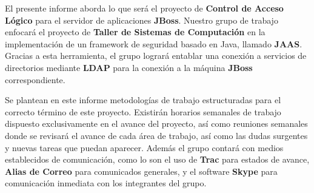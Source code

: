 El presente informe aborda lo que será el proyecto de \textbf{Control de Acceso Lógico} para el servidor de aplicaciones \textbf{JBoss}.
Nuestro grupo de trabajo enfocará el proyecto de \textbf{Taller de Sistemas de Computación} en la implementación de un framework
de seguridad basado en Java, llamado \textbf{JAAS}. Gracias a esta herramienta, el grupo logrará entablar una conexión a servicios de directorios mediante \textbf{LDAP} para la conexión a la máquina \textbf{JBoss} correspondiente.

Se plantean en este informe metodologías de trabajo estructuradas para el correcto término de este proyecto.
Existirán horarios semanales de trabajo dispuesto exclusivamente en el avance del proyecto, así como reuniones
semanales donde se revisará el avance de cada área de trabajo, así como las dudas surgentes y nuevas tareas que puedan
aparecer. Además el grupo contará con medios establecidos de comunicación, como lo son el uso de \textbf{Trac} para estados de avance,
\textbf{Alias de Correo} para comunicados generales, y el software \textbf{Skype} para comunicación inmediata con los integrantes del grupo.


